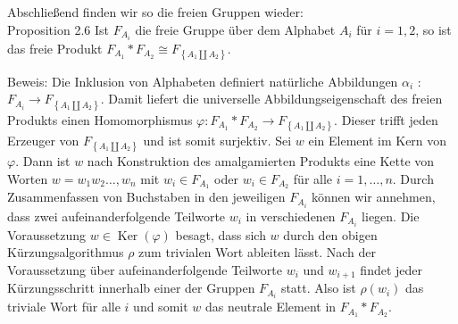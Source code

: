 \documentclass[10pt, letterpaper]{article}
\begin{document}
Abschließend finden wir so die freien Gruppen wieder:\\
Proposition 2.6 Ist $F_{A_{i}}$ die freie Gruppe über dem Alphabet $A_{i}$ für $i=1,2$, so ist das freie Produkt $F_{A_{1}} * F_{A_{2}} \cong F_{\left\{A_{1} \amalg A_{2}\right\}}$.

Beweis: Die Inklusion von Alphabeten definiert natürliche Abbildungen $\alpha_{i}$ : $F_{A_{i}} \rightarrow F_{\left\{A_{1} \amalg A_{2}\right\}}$. Damit liefert die universelle Abbildungseigenschaft des freien Produkts einen Homomorphismus $\varphi: F_{A_{1}} * F_{A_{2}} \rightarrow F_{\left\{A_{1} \amalg A_{2}\right\}}$. Dieser trifft jeden Erzeuger von $F_{\left\{A_{1} \amalg A_{2}\right\}}$ und ist somit surjektiv. Sei $w$ ein Element im Kern von $\varphi$. Dann ist $w$ nach Konstruktion des amalgamierten Produkts eine Kette von Worten $w=w_{1} w_{2} \ldots, w_{n}$ mit $w_{i} \in F_{A_{1}}$ oder $w_{i} \in F_{A_{2}}$ für alle $i=1, \ldots, n$. Durch Zusammenfassen von Buchstaben in den jeweiligen $F_{A_{i}}$ können wir annehmen, dass zwei aufeinanderfolgende Teilworte $w_{i}$ in verschiedenen $F_{A_{i}}$ liegen. Die Voraussetzung $w \in \operatorname{Ker}(\varphi)$ besagt, dass sich $w$ durch den obigen Kürzungsalgorithmus $\rho$ zum trivialen Wort ableiten lässt. Nach der Voraussetzung über aufeinanderfolgende Teilworte $w_{i}$ und $w_{i+1}$ findet jeder Kürzungsschritt innerhalb einer der Gruppen $F_{A_{i}}$ statt. Also ist $\rho\left(w_{i}\right)$ das triviale Wort für alle $i$ und somit $w$ das neutrale Element in $F_{A_{1}} * F_{A_{2}}$.
\end{document}
